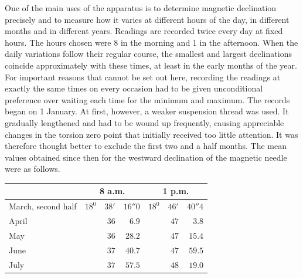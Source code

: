 One of the main uses of the apparatus is to determine magnetic declination precisely and to measure how it varies at different hours of the day, in different months and in different years. Readings are recorded twice every day at fixed hours. The hours chosen were 8 in the morning and 1 in the afternoon. When the daily variations follow their regular course, the smallest and largest declinations coincide approximately with these times, at least in the early months of the year. For important reasons that cannot be set out here, recording the readings at exactly the same times on every occasion had to be given unconditional preference over waiting each time for the minimum and maximum. The records began on 1 January. At first, however, a weaker suspension thread was used. It gradually lengthened and had to be wound up frequently, causing appreciable changes in the torsion zero point that initially received too little attention. It was therefore thought better to exclude the first two and a half months. The mean values obtained since then for the westward declination of the magnetic needle were as follows.
\begin{center}
\begin{tabular}{l|rrr|rrr}
 & \multicolumn{3}{c|}{8 a.m.} & \multicolumn{3}{c}{1 p.m.}\\\hline
March, second half & $18^0$ & $38'$ & $16''0$ & $18^0$ & $46'$ & $40''4$\\
April & & $36$ & $6.9$ & & $47$ & $3.8$\\
May & & $36$ & $28.2$ & & $47$ & $15.4$\\
June & & $37$ & $40.7$ & & $47$ & $59.5$\\
July & & $37$ & $57.5$ & & $48$ & $19.0$
\end{tabular}
\end{center}

